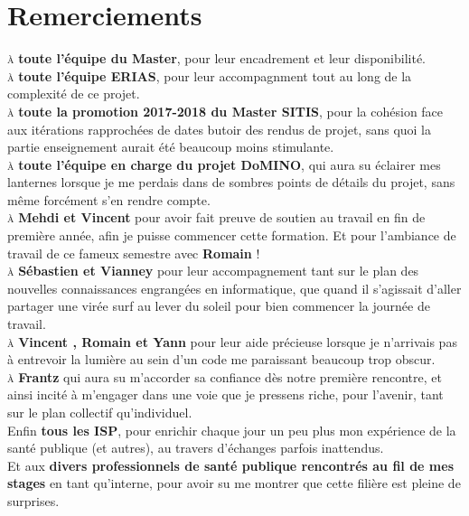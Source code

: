 \documentclass[a4paper, 12pt, openany, oneside, abstract=on]{article} %
\begin{document}

\renewcommand{\headrulewidth}{0.4pt} 
\renewcommand{\footrulewidth}{0.4pt}

\newpage
\part*{Remerciements}
\textsc{à} \textbf{toute l'équipe du Master}, pour leur encadrement et leur disponibilité.\\
\textsc{à} \textbf{toute l'équipe ERIAS}, pour leur accompagnment tout au long de la complexité de ce projet.\\
\textsc{à} \textbf{toute la promotion 2017-2018 du Master SITIS}, pour la cohésion face aux itérations rapprochées de dates butoir des rendus de projet, sans quoi la partie enseignement aurait été beaucoup moins stimulante.\\
\textsc{à} \textbf{toute l'équipe en charge du projet DoMINO}, qui aura su éclairer mes lanternes lorsque je me perdais dans de sombres points de détails du projet, sans même forcément s'en rendre compte.\\
\textsc{à} \textbf{Mehdi  et Vincent } pour avoir fait preuve de soutien au travail en fin de première année, afin je puisse commencer cette formation. Et pour l'ambiance de travail de ce fameux semestre avec \textbf{Romain } !\\
\textsc{à} \textbf{Sébastien  et Vianney } pour leur accompagnement tant sur le plan des nouvelles connaissances engrangées en informatique, que quand il s'agissait d'aller partager une virée surf au lever du soleil pour bien commencer la journée de travail.\\
\textsc{à} \textbf{Vincent , Romain  et Yann } pour leur aide précieuse lorsque je n'arrivais pas à entrevoir la lumière au sein d'un code me paraissant beaucoup trop obscur.\\
\textsc{à} \textbf{Frantz } qui aura su m'accorder sa confiance dès notre première rencontre, et ainsi incité à m'engager dans une voie que je pressens riche, pour l'avenir, tant sur le plan collectif qu'individuel.\\
Enfin \textbf{tous les ISP}, pour enrichir chaque jour un peu plus mon expérience de la santé publique (et autres), au travers d'échanges parfois inattendus.\\
Et aux \textbf{divers professionnels de santé publique rencontrés au fil de mes stages} en tant qu'interne, pour avoir su me montrer que cette filière est pleine de surprises.\\
\end{document}
